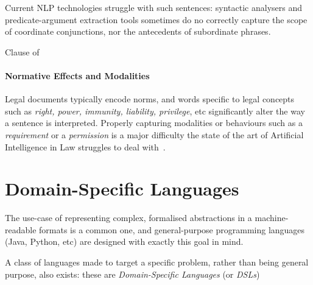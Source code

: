 Current NLP technologies struggle with such sentences: syntactic analysers and predicate-argument extraction tools sometimes do no correctly capture the scope of coordinate conjunctions, nor the antecedents of subordinate phrases.

\begin{table}[h]
    \centering
    \setlength{\fboxsep}{10pt}
    \caption{Clause  of~~\cite{seismicDataLicence}}
    \label{tab:geophys-long-clause}
\end{table}

\paragraph{Normative Effects and Modalities}

Legal documents typically encode norms, and words specific to legal concepts such as \emph{right, power, immunity, liability, privilege}, etc significantly alter the way a sentence is interpreted.
Properly capturing modalities or behaviours such as a \emph{requirement} or a \emph{permission} is a major difficulty the state of the art of Artificial Intelligence in Law struggles to deal with~\cite{ferraroLegalNLPSSurvey}.


\section{Domain-Specific Languages}\label{sec:dsls}

The use-case of representing complex, formalised abstractions in a machine-readable formats is a common one, and general-purpose programming languages (Java, Python, etc) are designed with exactly this goal in mind.

A class of languages made to target a specific problem, rather than being general purpose, also exists: these are \emph{Domain-Specific Languages} (or \emph{DSLs})

